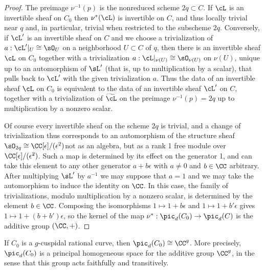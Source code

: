\begin{proof}
The preimage $\nu^{-1}(p)$ is the nonreduced scheme $2q \subset C$. If
$\cL$ is an invertible sheaf on
$C_{0}$ then $\nu^{*}(\cL)$ is invertible on $C$, and thus locally
trivial near $q$ and, in particular, trivial
when restricted to the subscheme $2q$. Conversely,
if $\cL'$ is an invertible sheaf on $C$ and we choose a trivialization
of $a: \cL'|_{U}\cong \sO_{U}$ on a neighborhood $ U\subset C$
of $q$, then there is an invertible sheaf $\cL$ on $C_{0}$ together with
a  trivialization
$a: \cL|_{\nu(U)}\cong \sO_{\nu(U)}$
on $\nu(U)$, unique up to an automorphism of $\sL'$ (that is, up to
multiplication by a scalar), that
pulls back to $\cL'$ with the given trivialization $a$.
Thus the data of an invertible sheaf $\cL$ on $C_0$ is equivalent
to the data of an invertible sheaf $\cL'$ on $C$, together with a
trivialization of $\widetilde \cL$ on the preimage $\nu^{-1}(p) = 2q$
up to multiplication by a nonzero scalar.

Of course every invertible sheaf on the 
scheme $2q$
is trivial, and a change of trivialization
thus corresponds to an automorphism of the structure sheaf $\sO_{2q}
\cong \CC[\epsilon]/(\epsilon^{2})$\emdash not as an algebra, but as a
rank 1 free module over $\CC[\epsilon]/(\epsilon^{2})$. Such a map is
determined by
its effect on the generator 1, and can take this element to any other
generator $a+b\epsilon$ with
$a\neq 0$ and $b\in \CC$ arbitrary. After multiplying $\sL'$ by $a^{-1}$
we may suppose that $a =1$ and we may take the automorphism to induce
the identity on $\CC$.
In this case, the family of trivializations, modulo multiplication by
a nonzero scalar, is
determined by the element $b\in \CC$. 
Composing the isomorphisms
$1\mapsto 1+b\epsilon$ and $1\mapsto 1+b'\epsilon$  gives $1\mapsto
1+(b+b')\epsilon$,
so the kernel of the map $\nu^{*}: \pic_{d}(C_{0}) \to \pic_{d}(C)$ is
the additive group $(\CC, +)$.
\end{proof}

\begin{corollary}
If $C_{0}$ is a $g$-cuspidal rational curve, then $\pic_{d}(C_{0})
\cong \CC^{g}$. More precisely,
%
$\pic_{d}(C_{0})$ is a principal homogeneous space for the additive
group $\CC^{g}$, in the sense that
this group acts faithfully and transitively.
\unif
\end{corollary}

